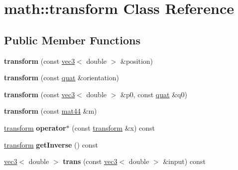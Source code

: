 \hypertarget{classmath_1_1transform}{
\section{math::transform Class Reference}
\label{classmath_1_1transform}
}
\subsection*{Public Member Functions}
\begin{DoxyCompactItemize}
\item 
\hypertarget{classmath_1_1transform_a00e7c32ca0e18106af19501fa172d95a}{
{\bfseries transform} (const \hyperlink{classmath_1_1vec3}{vec3}$<$ double $>$ \&position)}
\label{classmath_1_1transform_a00e7c32ca0e18106af19501fa172d95a}

\item 
\hypertarget{classmath_1_1transform_a23674aa54f06bceb548190843fc5440b}{
{\bfseries transform} (const \hyperlink{classmath_1_1quat}{quat} \&orientation)}
\label{classmath_1_1transform_a23674aa54f06bceb548190843fc5440b}

\item 
\hypertarget{classmath_1_1transform_aca5b8029bdba9b0dc09f50a787f8098e}{
{\bfseries transform} (const \hyperlink{classmath_1_1vec3}{vec3}$<$ double $>$ \&p0, const \hyperlink{classmath_1_1quat}{quat} \&q0)}
\label{classmath_1_1transform_aca5b8029bdba9b0dc09f50a787f8098e}

\item 
\hypertarget{classmath_1_1transform_a757ae081ea5b147cfd0b3ae669c61aa0}{
{\bfseries transform} (const \hyperlink{classmath_1_1mat44}{mat44} \&m)}
\label{classmath_1_1transform_a757ae081ea5b147cfd0b3ae669c61aa0}

\item 
\hypertarget{classmath_1_1transform_a02b219251ed55d966091ae6abc9da35c}{
\hyperlink{classmath_1_1transform}{transform} {\bfseries operator$\ast$} (const \hyperlink{classmath_1_1transform}{transform} \&x) const }
\label{classmath_1_1transform_a02b219251ed55d966091ae6abc9da35c}

\item 
\hypertarget{classmath_1_1transform_a3fb0d386d042716f6dbc83686de97712}{
\hyperlink{classmath_1_1transform}{transform} {\bfseries getInverse} () const }
\label{classmath_1_1transform_a3fb0d386d042716f6dbc83686de97712}

\item 
\hypertarget{classmath_1_1transform_aef71856e59f90a8d51a9a107dbbe8dd2}{
\hyperlink{classmath_1_1vec3}{vec3}$<$ double $>$ {\bfseries trans} (const \hyperlink{classmath_1_1vec3}{vec3}$<$ double $>$ \&input) const }
\label{classmath_1_1transform_aef71856e59f90a8d51a9a107dbbe8dd2}


\end{DoxyCompactItemize}
